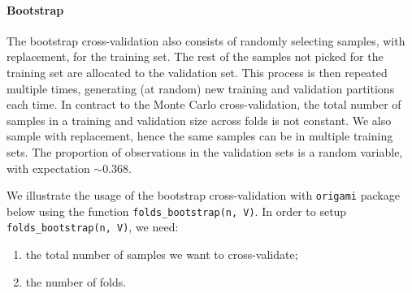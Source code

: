 \documentclass[12pt, krantz2,]{krantz}
\newenvironment{Shaded}{\begin{snugshade}}{\end{snugshade}}
\newcommand{\CommentTok}[1]{\textcolor[rgb]{0.37,0.37,0.37}{\textit{#1}}}
\newcommand{\DataTypeTok}[1]{\textcolor[rgb]{0.27,0.27,0.27}{#1}}
\newcommand{\DecValTok}[1]{\textcolor[rgb]{0.06,0.06,0.06}{#1}}
\newcommand{\FloatTok}[1]{\textcolor[rgb]{0.06,0.06,0.06}{#1}}
\newcommand{\KeywordTok}[1]{\textcolor[rgb]{0.27,0.27,0.27}{\textbf{#1}}}
\newcommand{\NormalTok}[1]{#1}
\newcommand{\StringTok}[1]{\textcolor[rgb]{0.5,0.5,0.5}{#1}}
\providecommand{\tightlist}{%
  \setlength{\itemsep}{0pt}\setlength{\parskip}{0pt}}
\let\oldparagraph\paragraph
\renewcommand{\paragraph}[1]{\oldparagraph{#1}\mbox{}}
\theoremstyle{definition}
\theoremstyle{definition}
\theoremstyle{definition}
\newcommand{\1}{\mathbbm{1}}
\begin{document}
\begin{Shaded}
\end{Shaded}

\hypertarget{bootstrap}{%
\paragraph{Bootstrap}\label{bootstrap}}

The bootstrap cross-validation also consists of randomly selecting samples, with
replacement, for the training set. The rest of the samples not picked for the
training set are allocated to the validation set. This process is then repeated
multiple times, generating (at random) new training and validation partitions
each time. In contract to the Monte Carlo cross-validation, the total number of
samples in a training and validation size across folds is not constant. We also
sample with replacement, hence the same samples can be in multiple training
sets. The proportion of observations in the validation sets is a random
variable, with expectation \(\sim 0.368\).

We illustrate the usage of the bootstrap cross-validation with \texttt{origami} package
below using the function \texttt{folds\_bootstrap(n,\ V)}. In order to setup
\texttt{folds\_bootstrap(n,\ V)}, we need:

\begin{enumerate}
\def\labelenumi{\arabic{enumi}.}
\tightlist
\item
  the total number of samples we want to cross-validate;
\item
  the number of folds.
\end{enumerate}
\end{document}
